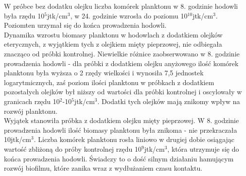 \documentclass[11pt,a4paper]{report}
\begin{document}
\clearpage
W próbce bez dodatku olejku liczba komórek planktonu w 8. godzinie hodowli była rzędu 10$^5$jtk/cm$^3$, w 24. godzinie wzrosła do poziomu 10$^10$jtk/cm$^3$. Poziomten urzymał się do końca prowadzenia hodowli.\\
Dynamika wzrostu biomasy planktonu w hodowlach z dodatkiem olejków eterycznych, z wyjątkiem tych z olejkiem mięty pieprzowej, nie odbiegała znacząco od próbki kontrolnej. Niewielkie różnice zaobserwowano w 8. godzinie prowadzenia hodowli - dla próbki z dodatkiem olejku anyżowego ilość komórek planktonu była wyższa o 2 rzędy wielkości i wynosiła 7,5 jednostek logarytmicznych, zaś poziom ilości planktonu w próbkach z dodatkiem pozostałych olejków był niższy od wartości dla próbki kontrolnej i oscylowały w granicach rzędu 10$^2$-10$^5$jtk/cm$^3$. Dodatki tych olejków mają znikomy wpływ na rozwój planktonu.\\
Wyjątek stanowiła próbka z dodatkiem olejku mięty pieprzowej. W 8. godzinie prowadzenia hodowli ilość biomasy planktonu była znikoma - nie przekraczała 10jtk/cm$^3$. Liczba komórek planktonu rosła liniowo w drugiej dobie osiągając wartość zbliżoną do próby kontrolnej rzędu 10$^9$jtk/cm$^3$, która utrzymuje się do końca prowadzenia hodowli. Świadczy to o dość silnym działaniu hamującym rozwój biofilmu, które zanika wraz z wydłużaniem czasu kontaktu.

\clearpage
\end{document}
